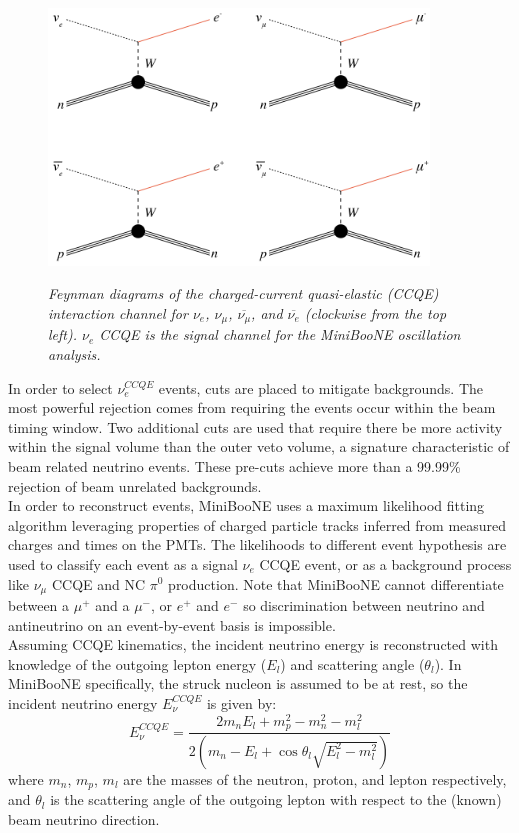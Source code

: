 \begin{figure}[ht!]
\centering
	\includegraphics[width=0.9\textwidth]{Figures/georgia_ccqe_feynman.png} \\
\caption{\textit{Feynman diagrams of the charged-current quasi-elastic (CCQE) interaction channel for $\nu_e$, $\nu_\mu$, $\overline{\nu_\mu}$, and $\overline{\nu_e}$ (clockwise from the top left). $\nu_e$ CCQE is the signal channel for the MiniBooNE oscillation analysis.}}\label{georgia_ccqe_feynman_fig}
\end{figure}


In order to select $\nu_e^{CCQE}$ events, cuts are placed to mitigate backgrounds. The most powerful rejection comes from requiring the events occur within the beam timing window. Two additional cuts are used that require there be more activity within the signal volume than the outer veto volume, a signature characteristic of beam related neutrino events. These pre-cuts achieve more than a 99.99\% rejection of beam unrelated backgrounds.\\

In order to reconstruct events, MiniBooNE uses a maximum likelihood fitting algorithm leveraging properties of charged particle tracks inferred from measured charges and times on the PMTs. The likelihoods to different event hypothesis are used to classify each event as a signal $\nu_e$ CCQE event, or as a background process like $\nu_\mu$ CCQE and NC $\pi^0$ production. Note that MiniBooNE cannot differentiate between a $\mu^+$ and a $\mu^-$, or $e^+$ and $e^-$ so discrimination between neutrino and antineutrino on an event-by-event basis is impossible.\\

Assuming CCQE kinematics, the incident neutrino energy is reconstructed with knowledge of the outgoing lepton energy ($E_l$) and scattering angle ($\theta_l$). In MiniBooNE specifically, the struck nucleon is assumed to be at rest, so the incident neutrino energy $E_\nu^{CCQE}$ is given by:
\begin{equation}\label{MB_CCQE_formula}
E_\nu^{CCQE} = \frac{2m_nE_l+m_p^2-m_n^2-m_l^2}{2(m_n-E_l+\cos\theta_l\sqrt{E_l^2-m_l^2})}
\end{equation}
where $m_n$, $m_p$, $m_l$ are the masses of the neutron, proton, and lepton respectively, and $\theta_l$ is the scattering angle of the outgoing lepton with respect to the (known) beam neutrino direction.\\

